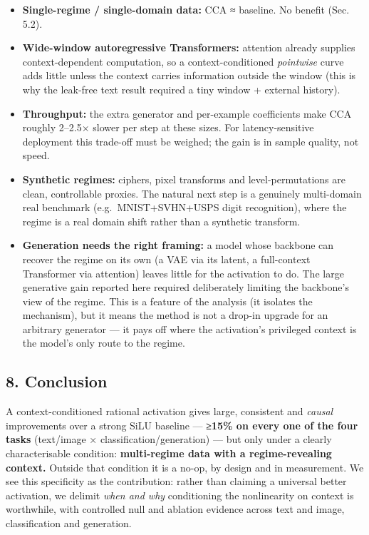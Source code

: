 \documentclass[
  11pt,
]{article}
\providecommand{\tightlist}{%
  \setlength{\itemsep}{0pt}\setlength{\parskip}{0pt}}
\begin{document}
\begin{itemize}
\tightlist
\item
  \textbf{Single-regime / single-domain data:} CCA ≈ baseline. No
  benefit (Sec. 5.2).
\item
  \textbf{Wide-window autoregressive Transformers:} attention already
  supplies context-dependent computation, so a context-conditioned
  \emph{pointwise} curve adds little unless the context carries
  information outside the window (this is why the leak-free text result
  required a tiny window + external history).
\item
  \textbf{Throughput:} the extra generator and per-example coefficients
  make CCA roughly 2--2.5× slower per step at these sizes. For
  latency-sensitive deployment this trade-off must be weighed; the gain
  is in sample quality, not speed.
\item
  \textbf{Synthetic regimes:} ciphers, pixel transforms and
  level-permutations are clean, controllable proxies. The natural next
  step is a genuinely multi-domain real benchmark (e.g.~MNIST+SVHN+USPS
  digit recognition), where the regime is a real domain shift rather
  than a synthetic transform.
\item
  \textbf{Generation needs the right framing:} a model whose backbone
  can recover the regime on its own (a VAE via its latent, a
  full-context Transformer via attention) leaves little for the
  activation to do. The large generative gain reported here required
  deliberately limiting the backbone's view of the regime. This is a
  feature of the analysis (it isolates the mechanism), but it means the
  method is not a drop-in upgrade for an arbitrary generator --- it pays
  off where the activation's privileged context is the model's only
  route to the regime.
\end{itemize}

\subsection{8. Conclusion}\label{conclusion}

A context-conditioned rational activation gives large, consistent and
\emph{causal} improvements over a strong SiLU baseline --- \textbf{≥15\%
on every one of the four tasks} (text/image × classification/generation)
--- but only under a clearly characterisable condition:
\textbf{multi-regime data with a regime-revealing context.} Outside that
condition it is a no-op, by design and in measurement. We see this
specificity as the contribution: rather than claiming a universal better
activation, we delimit \emph{when and why} conditioning the nonlinearity
on context is worthwhile, with controlled null and ablation evidence
across text and image, classification and generation.
\end{document}
